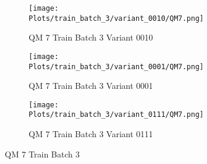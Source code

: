 \documentclass{DissertateFigs}
\begin{document}
\begin{figure}[t!]
\medskip

    \begin{subfigure}{0.47\textwidth}
    \texttt{[image: Plots/train\_batch\_3/variant\_0010/QM7.png]}
    \caption{QM 7 Train Batch 3 Variant 0010}
    \end{subfigure}
    \begin{subfigure}{0.47\textwidth}
    \texttt{[image: Plots/train\_batch\_3/variant\_0001/QM7.png]}
    \caption{QM 7 Train Batch 3 Variant 0001}
    \end{subfigure}

\medskip

    \begin{subfigure}{0.47\textwidth}
    \texttt{[image: Plots/train\_batch\_3/variant\_0111/QM7.png]}
    \caption{QM 7 Train Batch 3 Variant 0111}
    \end{subfigure}
\caption{QM 7 Train Batch 3}
    \end{figure}
\clearpage
\end{document}

